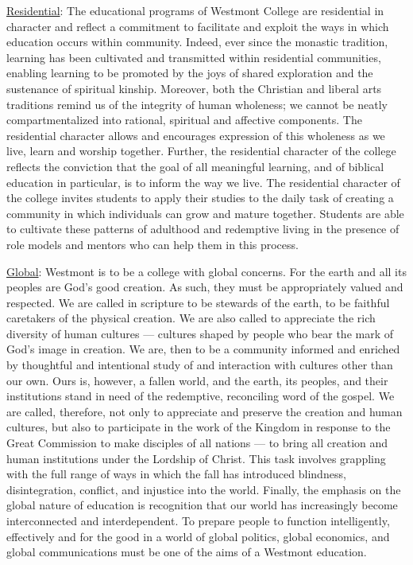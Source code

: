   \underline{Residential}:  The educational programs of Westmont College are residential in character and reflect a commitment to facilitate and exploit the ways in which education occurs within community.  Indeed, ever since the monastic tradition, learning has been cultivated and transmitted within residential communities, enabling learning to be promoted by the joys of shared exploration and the sustenance of spiritual kinship.  Moreover, both the Christian and liberal arts traditions remind us of the integrity of human wholeness; we cannot be neatly compartmentalized into rational, spiritual and affective components.  The residential character allows and encourages expression of this wholeness as we live, learn and worship together.  Further, the residential character of the college reflects the conviction that the goal of all meaningful learning, and of biblical education in particular, is to inform the way we live.  The residential character of the college invites students to apply their studies to the daily task of creating a community in which individuals can grow and mature together.  Students are able to cultivate these patterns of adulthood and redemptive living in the presence of role models and mentors who can help them in this process.
  
\underline{Global}:  Westmont is to be a college with global concerns.  For the earth and all its peoples are God's good creation.  As such, they must be appropriately valued and respected.  We are called in scripture to be stewards of the earth, to be faithful caretakers of the physical creation.  We are also called to appreciate the rich diversity of human cultures --- cultures shaped by people who bear the mark of God's image in creation.  We are, then to be a community informed and enriched by thoughtful and intentional study of and interaction with cultures other than our own.  Ours is, however, a fallen world, and the earth, its peoples, and their institutions stand in need of the redemptive, reconciling word of the gospel.  We are called, therefore, not only to appreciate and preserve the creation and human cultures, but also to participate in the work of the Kingdom in response to the Great Commission to make disciples of all nations --- to bring all creation and human institutions under the Lordship of Christ.  This task involves grappling with the full range of ways in which the fall has introduced blindness, disintegration, conflict, and injustice into the world.  Finally, the emphasis on the global nature of education is recognition that our world has increasingly become interconnected and interdependent.  To prepare people to function intelligently, effectively and for the good in a world of global politics, global economics, and global communications must be one of the aims of a Westmont education.


